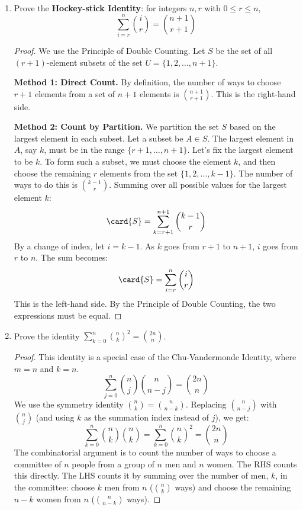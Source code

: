 \begin{enumerate}
    \item {} Prove the \textbf{Hockey-stick Identity}: for integers $n, r$ with $0 \le r \le n$,
    $$ \sum_{i=r}^{n} \binom{i}{r} = \binom{n+1}{r+1} $$
    \begin{proof}
    We use the Principle of Double Counting. Let $S$ be the set of all $(r+1)$-element subsets of the set $U = \{1, 2, \dots, n+1\}$.
    
    \textbf{Method 1: Direct Count.}
    By definition, the number of ways to choose $r+1$ elements from a set of $n+1$ elements is $\binom{n+1}{r+1}$. This is the right-hand side.
    
    \textbf{Method 2: Count by Partition.}
    We partition the set $S$ based on the largest element in each subset. Let a subset be $A \in S$. The largest element in $A$, say $k$, must be in the range $\{r+1, \dots, n+1\}$.
    Let's fix the largest element to be $k$. To form such a subset, we must choose the element $k$, and then choose the remaining $r$ elements from the set $\{1, 2, \dots, k-1\}$. The number of ways to do this is $\binom{k-1}{r}$.
    Summing over all possible values for the largest element $k$:
    $$ \card{S} = \sum_{k=r+1}^{n+1} \binom{k-1}{r} $$
    By a change of index, let $i = k-1$. As $k$ goes from $r+1$ to $n+1$, $i$ goes from $r$ to $n$. The sum becomes:
    $$ \card{S} = \sum_{i=r}^{n} \binom{i}{r} $$
    This is the left-hand side. By the Principle of Double Counting, the two expressions must be equal.
    \end{proof}

    \item {} Prove the identity $\sum_{k=0}^{n} \binom{n}{k}^2 = \binom{2n}{n}$.
    \begin{proof}
    This identity is a special case of the Chu-Vandermonde Identity, where $m=n$ and $k=n$.
    $$ \sum_{j=0}^{n} \binom{n}{j}\binom{n}{n-j} = \binom{2n}{n} $$
    We use the symmetry identity $\binom{n}{k} = \binom{n}{n-k}$. Replacing $\binom{n}{n-j}$ with $\binom{n}{j}$ (and using $k$ as the summation index instead of $j$), we get:
    $$ \sum_{k=0}^{n} \binom{n}{k}\binom{n}{k} = \sum_{k=0}^{n} \binom{n}{k}^2 = \binom{2n}{n} $$
    The combinatorial argument is to count the number of ways to choose a committee of $n$ people from a group of $n$ men and $n$ women. The RHS counts this directly. The LHS counts it by summing over the number of men, $k$, in the committee: choose $k$ men from $n$ ($\binom{n}{k}$ ways) and choose the remaining $n-k$ women from $n$ ($\binom{n}{n-k}$ ways).
    \end{proof}
    

\end{enumerate}

